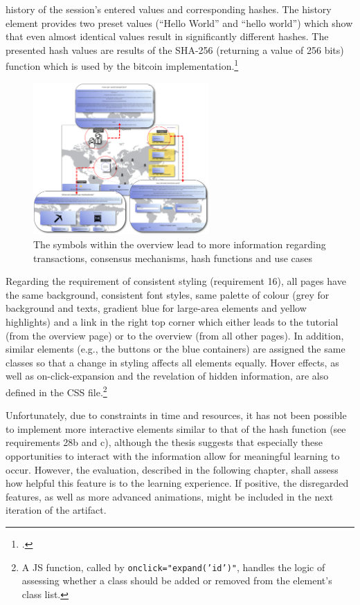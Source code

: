 history of the session's entered values and corresponding hashes. The history element provides two preset values (\enquote{Hello World} and \enquote{hello world}) which show that even almost identical values result in significantly different hashes. The presented hash values are results of the \ac{SHA}-256 (returning a value of 256 bits) function which is used by the bitcoin implementation.\footcite[][]{LuffJavaScriptSHA256demo2014}

\begin{figure}
    \centering
    \includegraphics[width=0.6\textwidth]{latex-vorlage_v1.5/graphics/overview.png}
    \caption[The symbols within the overview lead to more information regarding transactions, consensus mechanisms, hash functions and use cases]{The symbols within the overview lead to more information regarding transactions, consensus mechanisms, hash functions and use cases\protect\footnotemark}
    \label{fig:AniOW}
\end{figure}

Regarding the requirement of consistent styling (requirement 16), all pages have the same background, consistent font styles, same palette of colour (grey for background and texts, gradient blue for large-area elements and yellow highlights) and a link in the right top corner which either leads to the tutorial (from the overview page) or to the overview (from all other pages). In addition, similar elements (e.g., the buttons or the blue containers) are assigned the same classes so that a change in styling affects all elements equally. Hover effects, as well as on-click-expansion and the revelation of hidden information, are also defined in the \ac{CSS} file.\footnote{A \ac{JS} function, called by \texttt{onclick="expand('id')"}, handles the logic of assessing whether a class should be added or removed from the element's class list.} 


Unfortunately, due to constraints in time and resources, it has not been possible to implement more interactive elements similar to that of the hash function (see requirements 28b and c), although the thesis suggests that especially these opportunities to interact with the information allow for meaningful learning to occur. However, the evaluation, described in the following chapter, shall assess how helpful this feature is to the learning experience. If positive, the disregarded features, as well as more advanced animations, might be included in the next iteration of the artifact. 